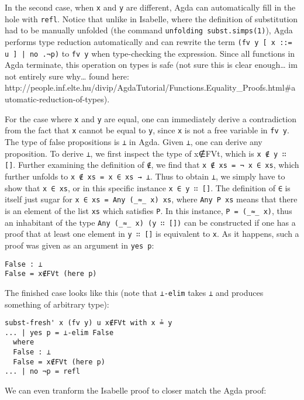 \documentclass[a4paper, 12pt, twoside]{style/ociamthesis}
\let\OldTexttt\texttt
\renewcommand{\texttt}[1]{\small\OldTexttt{#1}}
\begin{document}
In the second case, when \texttt{x} and \texttt{y} are different, Agda
can automatically fill in the hole with \texttt{refl}. Notice that
unlike in Isabelle, where the definition of substitution had to be
manually unfolded (the command \texttt{unfolding subst.simps(1)}), Agda
performs type reduction automatically and can rewrite the term
\texttt{(fv y [ x ::= u ] | no .¬p)} to \texttt{fv y} when type-checking
the expression. Since all functions in Agda terminate, this operation on
types is safe (not sure this is clear enough\ldots{} im not entirely
sure why\ldots{} found here:
http://people.inf.elte.hu/divip/AgdaTutorial/Functions.Equality\_Proofs.html\#automatic-reduction-of-types).

For the case where \texttt{x} and \texttt{y} are equal, one can
immediately derive a contradiction from the fact that \texttt{x} cannot
be equal to \texttt{y}, since \texttt{x} is not a free variable in
\texttt{fv y}. The type of false propositions is \texttt{⊥} in Agda.
Given \texttt{⊥}, one can derive any proposition. To derive \texttt{⊥},
we first inspect the type of x∉FVt, which is \texttt{x ∉ y ∷ []}.
Further examining the definition of \texttt{∉}, we find that
\texttt{x ∉ xs = ¬ x ∈ xs}, which further unfolds to
\texttt{x ∉ xs = x ∈ xs → ⊥}. Thus to obtain \texttt{⊥}, we simply have
to show that \texttt{x ∈ xs}, or in this specific instance
\texttt{x ∈ y ∷ []}. The definition of \texttt{∈} is itself just sugar
for \texttt{x ∈ xs = Any (\_≈\_ x) xs}, where \texttt{Any P xs} means
that there is an element of the list \texttt{xs} which satisfies
\texttt{P}. In this instance, \texttt{P = (\_≈\_ x)}, thus an inhabitant
of the type \texttt{Any (\_≈\_ x) (y ∷ [])} can be constructed if one
has a proof that at least one element in \texttt{y ∷ []} is equivalent
to \texttt{x}. As it happens, such a proof was given as an argument in
\texttt{yes p}:

\begin{verbatim}
False : ⊥
False = x∉FVt (here p)
\end{verbatim}

The finished case looks like this (note that \texttt{⊥-elim} takes
\texttt{⊥} and produces something of arbitrary type):

\begin{verbatim}
subst-fresh' x (fv y) u x∉FVt with x ≟ y
... | yes p = ⊥-elim False
  where
  False : ⊥
  False = x∉FVt (here p)
... | no ¬p = refl
\end{verbatim}

We can even tranform the Isabelle proof to closer match the Agda proof:
\end{document}
